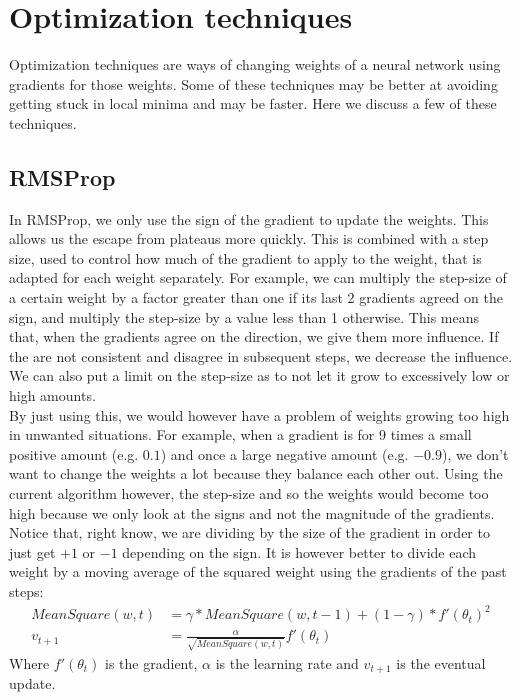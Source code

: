 \documentclass[a4paper]{article}
\begin{document}
\section{Optimization techniques}
Optimization techniques are ways of changing weights of a neural network using gradients for those weights. Some of these techniques may be better at avoiding getting stuck in local minima and may be faster. Here we discuss a few of these techniques.

\subsection{RMSProp}

In RMSProp, we only use the sign of the gradient to update the weights. This allows us the escape from plateaus more quickly. This is combined with a step size, used to control how much of the gradient to apply to the weight, that is adapted for each weight separately. For example, we can multiply the step-size of a certain weight by a factor greater than one if its last 2 gradients agreed on the sign, and multiply the step-size by a value less than 1 otherwise. This means that, when the gradients agree on the direction, we give them more influence. If the are not consistent and disagree in subsequent steps, we decrease the influence. We can also put a limit on the step-size as to not let it grow to excessively low or high amounts.\\
By just using this, we would however have a problem of weights growing too high in unwanted situations. For example, when a gradient is for 9 times a small positive amount (e.g. $0.1$) and once a large negative amount (e.g. $-0.9$), we don't want to change the weights a lot because they balance each other out. Using the current algorithm however, the step-size and so the weights would become too high because we only look at the signs and not the magnitude of the gradients.\\
Notice that, right know, we are dividing by the size of the gradient in order to just get $+1$ or $-1$ depending on the sign. It is however better to divide each weight by a moving average of the squared weight using the gradients of the past steps:
\begin{align}
MeanSquare(w, t) &= \gamma * MeanSquare(w, t-1) + (1 - \gamma) * f'(\theta_t)^2 \\
v_{t+1} &= \frac{\alpha}{\sqrt{MeanSquare(w,t)}}f'(\theta_t)
\end{align}
Where $f'(\theta_t)$ is the gradient, $\alpha$ is the learning rate and $v_{t+1}$ is the eventual update.
\end{document}

